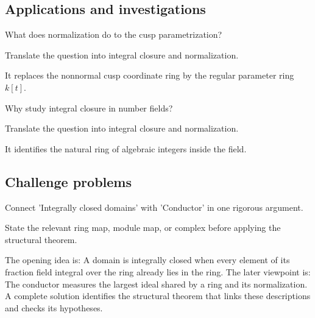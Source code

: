 \subsection*{Applications and investigations}

\begin{exercise}\label{exr:v20-expand-13}
What does normalization do to the cusp parametrization?
\end{exercise}
\begin{hint}
Translate the question into integral closure and normalization.
\end{hint}
\begin{solution}
It replaces the nonnormal cusp coordinate ring by the regular parameter ring $k[t]$.
\end{solution}

\begin{exercise}\label{exr:v20-expand-14}
Why study integral closure in number fields?
\end{exercise}
\begin{hint}
Translate the question into integral closure and normalization.
\end{hint}
\begin{solution}
It identifies the natural ring of algebraic integers inside the field.
\end{solution}

\subsection*{Challenge problems}

\begin{exercise}\label{exr:v20-expand-15}
Connect 'Integrally closed domains' with 'Conductor' in one rigorous argument.
\end{exercise}
\begin{hint}
State the relevant ring map, module map, or complex before applying the structural theorem.
\end{hint}
\begin{solution}
The opening idea is: A domain is integrally closed when every element of its fraction field integral over the ring already lies in the ring. The later viewpoint is: The conductor measures the largest ideal shared by a ring and its normalization. A complete solution identifies the structural theorem that links these descriptions and checks its hypotheses.
\end{solution}

